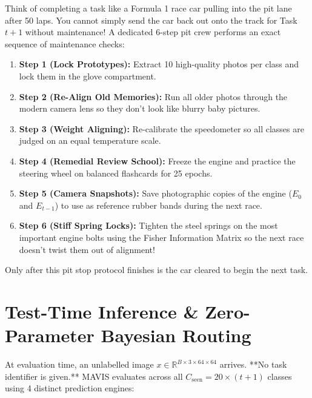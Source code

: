 \documentclass[11pt,a4paper]{article}
\begin{document}
\begin{callout}
Think of completing a task like a Formula 1 race car pulling into the pit lane after 50 laps.\newline
You cannot simply send the car back out onto the track for Task $t+1$ without maintenance! A dedicated 6-step pit crew performs an exact sequence of maintenance checks:
\begin{enumerate}[noitemsep]
    \item \textbf{Step 1 (Lock Prototypes):} Extract 10 high-quality photos per class and lock them in the glove compartment.
    \item \textbf{Step 2 (Re-Align Old Memories):} Run all older photos through the modern camera lens so they don't look like blurry baby pictures.
    \item \textbf{Step 3 (Weight Aligning):} Re-calibrate the speedometer so all classes are judged on an equal temperature scale.
    \item \textbf{Step 4 (Remedial Review School):} Freeze the engine and practice the steering wheel on balanced flashcards for 25 epochs.
    \item \textbf{Step 5 (Camera Snapshots):} Save photographic copies of the engine ($E_0$ and $E_{t-1}$) to use as reference rubber bands during the next race.
    \item \textbf{Step 6 (Stiff Spring Locks):} Tighten the steel springs on the most important engine bolts using the Fisher Information Matrix so the next race doesn't twist them out of alignment!
\end{enumerate}
Only after this pit stop protocol finishes is the car cleared to begin the next task.
\end{callout}

\newpage

\section{Test-Time Inference \& Zero-Parameter Bayesian Routing}
\label{sec:inference}

At evaluation time, an unlabelled image $x \in \mathbb{R}^{B \times 3 \times 64 \times 64}$ arrives. **No task identifier is given.** MAVIS evaluates across all $C_{\text{seen}} = 20 \times (t+1)$ classes using 4 distinct prediction engines:
\end{document}
